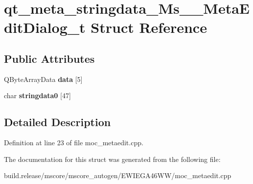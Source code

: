 \hypertarget{structqt__meta__stringdata___ms_____meta_edit_dialog__t}{}\section{qt\+\_\+meta\+\_\+stringdata\+\_\+\+Ms\+\_\+\+\_\+\+Meta\+Edit\+Dialog\+\_\+t Struct Reference}
\label{structqt__meta__stringdata___ms_____meta_edit_dialog__t}
\subsection*{Public Attributes}
\begin{DoxyCompactItemize}
\item 
\mbox{\label{structqt__meta__stringdata___ms_____meta_edit_dialog__t_a7214e8c0fe8f86d63a81fb24cca71299}} 
Q\+Byte\+Array\+Data {\bfseries data} \mbox{[}5\mbox{]}
\item 
\mbox{\label{structqt__meta__stringdata___ms_____meta_edit_dialog__t_ad977956a8432684356f4322d69d25e78}} 
char {\bfseries stringdata0} \mbox{[}47\mbox{]}
\end{DoxyCompactItemize}


\subsection{Detailed Description}


Definition at line 23 of file moc\+\_\+metaedit.\+cpp.



The documentation for this struct was generated from the following file\+:\begin{DoxyCompactItemize}
\item 
build.\+release/mscore/mscore\+\_\+autogen/\+E\+W\+I\+E\+G\+A46\+W\+W/moc\+\_\+metaedit.\+cpp\end{DoxyCompactItemize}
